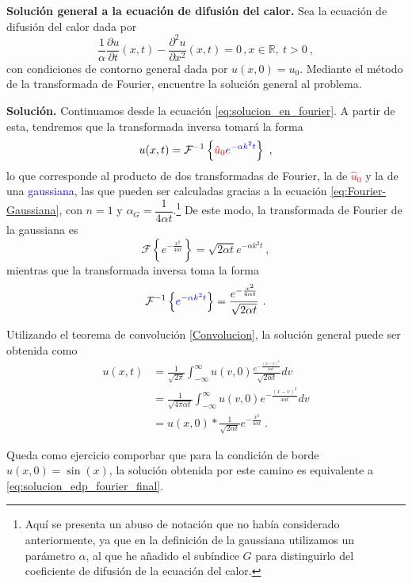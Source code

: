 \begin{ejemplo}
    \textbf{Solución general a la ecuación de difusión del calor.} Sea la ecuación de difusión del calor dada por
    \begin{equation} \label{eq:Fourier_EDP}
        \frac{1}{\alpha} \frac{\partial u}{\partial t} (x,t) - \frac{\partial^2 u}{\partial x^2}(x,t) = 0 \, , x \in \mathbb{R}, \ t>0 \ ,
    \end{equation}
    con condiciones de contorno general dada por $u(x,0) = u_0$. Mediante el método de la transformada de Fourier, encuentre la solución general al problema.

    \textbf{Solución.} Continuamos desde la ecuación \eqref{eq:solucion_en_fourier}. A partir de esta, tendremos que la transformada inversa tomará la forma
    \begin{equation}
        u(x,t) = \mathcal{F}^{-1} \left\{ \textcolor{red}{\hat{u}_0} \textcolor{blue}{e^{-\alpha k^2 t}} \right\} \ ,
    \end{equation}
    lo que corresponde al producto de dos transformadas de Fourier, la de \textcolor{red}{$\hat{u}_0$} y la de una \textcolor{blue}{gaussiana}, las que pueden ser calculadas gracias a la ecuación \eqref{eq:Fourier-Gaussiana}, con $n=1$ y $\alpha_G = \dfrac{1}{4\alpha t}$.\footnote{Aquí se presenta un abuso de notación que no había considerado anteriormente, ya que en la definición de la gaussiana utilizamos un parámetro $\alpha$, al que he añadido el subíndice $G$ para distinguirlo del coeficiente de difusión de la ecuación del calor.} 
    De este modo, la transformada de Fourier de la gaussiana es
    \begin{equation}
        \mathcal{F}\left\{ e^{-\frac{x^2}{4\alpha t}} \right\} = \sqrt{2\alpha t} e^{-\alpha k^2 t} \ ,
    \end{equation}
    mientras que la transformada inversa toma la forma 
    \begin{equation}
        \mathcal{F}^{-1}\left\{ \textcolor{blue}{e^{-\alpha k^2 t}} \right\} = \frac{e^{-\frac{x^2}{4\alpha t}}}{\sqrt{2\alpha t}}  \ .
    \end{equation}

    Utilizando el teorema de convolución \eqref{Convolucion}, la solución general puede ser obtenida como
    \begin{align}
        u(x,t) & = \frac{1}{\sqrt{2\pi}} \int_{-\infty}^\infty u(v,0) \frac{e^{- \frac{(x-v)^2}{4\alpha t}}}{\sqrt{2\alpha t}} dv \\
        & = \frac{1}{\sqrt{4\pi \alpha t}} \int_{-\infty}^\infty u(v,0) e^{- \frac{(x-v)^2}{4\alpha t}} dv \\
        & = u(x,0) \ast \frac{1}{\sqrt{2\alpha t}}e^{-\frac{x^2}{4\alpha t}} \ .
    \end{align}

    Queda como ejercicio comporbar que para la condición de borde $u(x,0) = \sin(x)$, la solución obtenida por este camino es equivalente a \eqref{eq:solucion_edp_fourier_final}.
\end{ejemplo}